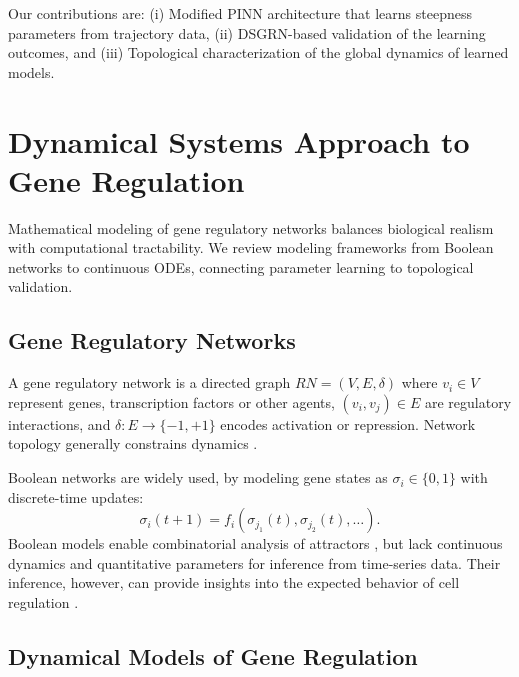 \documentclass[11pt]{article}
\begin{document}
Our contributions are: (i) Modified PINN architecture that learns steepness parameters from trajectory data, (ii) DSGRN-based  validation of the learning outcomes, and (iii) Topological characterization of the global dynamics of learned models.

\section{Dynamical Systems Approach to Gene Regulation}
\label{sec:grn}

Mathematical modeling of gene regulatory networks balances biological realism with computational tractability. We review modeling frameworks from Boolean networks to continuous ODEs, connecting parameter learning to topological validation.

\subsection{Gene Regulatory Networks}
A gene regulatory network is a directed graph $RN = (V, E, \delta)$ where $v_i \in V$ represent genes, transcription factors or other agents, $(v_i, v_j) \in E$ are regulatory interactions, and $\delta: E \to \{-1, +1\}$ encodes activation or repression. Network topology generally constrains dynamics \cite{}.

Boolean networks \cite{kauffman1969,thomas1973} are widely used, by modeling gene states as $\sigma_i \in \{0,1\}$ with discrete-time updates:
\begin{equation}
  \sigma_i(t+1) = f_i(\sigma_{j_1}(t), \sigma_{j_2}(t), \ldots).
\end{equation}
Boolean models enable combinatorial analysis of attractors \cite{}, but lack continuous dynamics and quantitative parameters for inference from time-series data. Their inference, however, can provide insights into the expected behavior of cell regulation \cite{}. 

\subsection{Dynamical Models of Gene Regulation}
\end{document}
